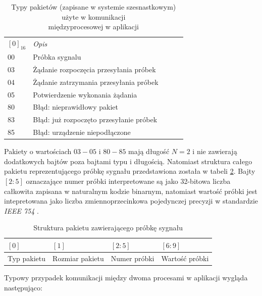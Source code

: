 \begin{table}[h!]
\centering
    \caption{Typy pakietów (zapisane w systemie szesnastkowym)
    użyte w komunikacji \\międzyprocesowej w aplikacji}
\label{tab:ipc_types}
\begin{tabular}{|l|l|lll}
\cline{1-2}
$[0]_{16}$ & \textit{Opis}             &  &  &  \\ \cline{1-2}
00 & Próbka sygnalu                         &  &  &  \\ \cline{1-2}
03 & Żądanie rozpoczęcia przesyłania próbek &  &  &  \\ \cline{1-2}
04 & Żądanie zatrzymania przesyłania próbek &  &  &  \\ \cline{1-2}
05 & Potwierdzenie wykonania żądania        &  &  &  \\ \cline{1-2}
80 & Błąd: nieprawidłowy pakiet             &  &  &  \\ \cline{1-2}
83 & Błąd: już rozpoczęto przesyłanie próbek&  &  &  \\ \cline{1-2}
85 & Błąd: urządzenie niepodłączone         &  &  &  \\ \cline{1-2}
\end{tabular}
\end{table}

Pakiety o wartościach $03-05$ i $80-85$ mają długość $N=2$ i nie zawierają dodatkowych 
bajtów poza bajtami typu i długością.
Natomiast struktura całego pakietu reprezentującego próbkę sygnału przedstawiona została w tabeli
\ref{tab:ipc_sample_pack}. Bajty $[2:5]$ oznaczające numer próbki interpretowane są jako 32-bitowa
liczba całkowita zapisana w naturalnym kodzie binarnym, 
natomiast wartość próbki jest intepretowana jako liczba zmiennoprzecinkowa pojedynczej precyzji w standardzie \textit{IEEE 754} \cite{IEE754}.

\begin{table}[h!]
\centering
\caption{Struktura pakietu zawierającego próbkę sygnału}
\label{tab:ipc_sample_pack}
\begin{tabular}{|l|l|l|l|}
\hline
$[0]$       & $[1]$           & $[2:5]$      & $[6:9]$        \\ \hline
Typ pakietu & Rozmiar pakietu & Numer próbki & Wartość próbki \\ \hline
\end{tabular}
\end{table}

\newpage

Typowy przypadek komunikacji między dwoma procesami w aplikacji wygląda następująco:

